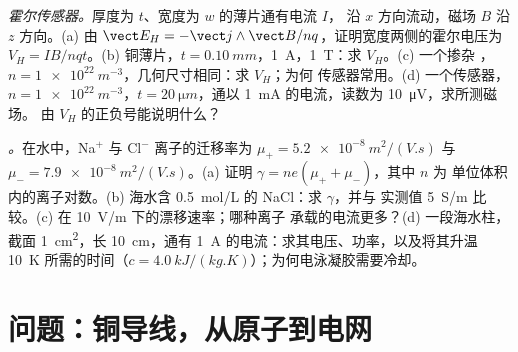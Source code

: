 \begin{exercise}[$\star\star\star$]\label{exo:b2:charges-currents-conduction:11}
\emph{霍尔传感器。}厚度为 $t$、宽度为 $w$ 的薄片通有电流 $I$，
沿 $x$ 方向流动，磁场 $B$ 沿 $z$ 方向。(a) 由 $\vect E_H = -\vect j\wedge\vect B
/nq$，证明宽度两侧的霍尔电压为 $V_H = IB/nqt$。(b)
铜薄片，$t = \qty{0.10}{mm}$，\qty{1}{A}，\qty{1}{T}：求 $V_H$。(c) 一个掺杂
，$n = \qty{1e22}{m^{-3}}$，几何尺寸相同：求 $V_H$；为何
传感器常用。(d) 一个传感器，$n = \qty{1e22}{m^{-3}}$，$t =
\qty{20}{\micro m}$，通以 \qty{1}{mA} 的电流，读数为 \qty{10}{\micro V}，求所测磁场。
由 $V_H$ 的正负号能说明什么？
\end{exercise}

\begin{exercise}[$\star\star\star$]\label{exo:b2:charges-currents-conduction:12}
\emph{。}在水中，Na$^+$ 与 Cl$^-$ 离子的迁移率为
$\mu_+ = \qty{5.2e-8}{m^2/(V.s)}$ 与 $\mu_- = \qty{7.9e-8}{m^2/(V.s)}$。(a)
证明 $\gamma = ne(\mu_+ + \mu_-)$，其中 $n$ 为
单位体积内的离子对数。(b) 海水含 \qty{0.5}{mol/L} 的 NaCl：求 $\gamma$，并与
实测值 \qty{5}{S/m} 比较。(c) 在 \qty{10}{V/m} 下的漂移速率；哪种离子
承载的电流更多？(d) 一段海水柱，截面 \qty{1}{cm^2}，长 \qty{10}{cm}，通有
\qty{1}{A} 的电流：求其电压、功率，以及将其升温 \qty{10}{K} 所需的时间（$c =
\qty{4.0}{kJ/(kg.K)}$）；为何电泳凝胶需要冷却。
\end{exercise}

\section{问题：铜导线，从原子到电网}

